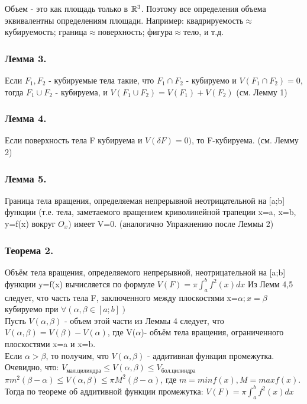 \begin{opred}
	Объем - это как площадь только в $\mathbb{R}^3$.
	Поэтому все определения объема эквивалентны определениям площади. Например:
	квадрируемость$\approx$кубируемость;
	граница$\approx$поверхность;
	фигура$\approx$тело, и т.д.
\end{opred}

\subsubsection{Лемма 3.}
Если $F_1,F_2$ - кубируемые тела такие, что $F_1\cap F_2$ - кубируемо и $V(F_1 \cap F_2)=0$, тогда $F_1\cup F_2$ - кубируема, и $V(F_1 \cup F_2)=V(F_1)+V(F_2)$
\dokvo
(см. Лемму 1)

\subsubsection{Лемма 4.}
Если поверхность тела F кубируема и $V(\delta F)=0)$, то F-кубируема.
\dokvo
(см. Лемму 2)

\subsubsection{Лемма 5.}
Граница тела вращения, определяемая непрерывной неотрицательной на [a;b] функции (т.е. тела, заметаемого вращением криволинейной трапеции x=a, x=b, y=f(x) вокруг $O_x$) имеет V=0.
\dokvo
(аналогично Упражнению после Леммы 2)

\subsubsection{Теорема 2.}
Объём тела вращения, определяемого непрерывной, неотрицательной на [a;b] функции y=f(x) вычисляется по формуле $V(F)=\pi\int_{a}^{b}f^2(x)dx$
\dokvo
Из Лемм 4,5 следует, что часть тела F, заключенного между плоскостями x=$\alpha;x=\beta$ кубируемо при $\forall(\alpha,\beta \in [a;b])$
\\
Пусть $V(\alpha,\beta)$ - объем этой части из Леммы 4 следует, что $V(\alpha,\beta)=V(\beta)-V(\alpha)$, где V($\alpha$)- объём тела вращения, ограниченного плоскостями x=a и x=b.
\\
Если $\alpha>\beta$, то получим, что $V(\alpha,\beta)$ - аддитивная функция промежутка. Очевидно, что:
$V_{мал.цилиндра}\leqslant V(\alpha,\beta) \leqslant V_{бол.цилиндра}$
\\
$\pi m^2(\beta-\alpha) \leqslant V(\alpha,\beta) \leqslant \pi M^2(\beta-\alpha)$,
где $m=min f(x), M=max f(x)$.
Тогда по теореме об аддитивной функции промежутка:
$V(F)=\pi\int_{a}^{b} f^2(x) dx$